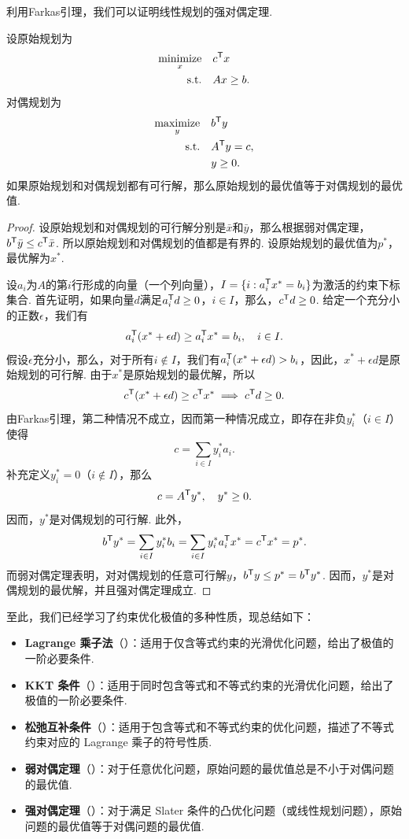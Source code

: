 利用Farkas引理，我们可以证明线性规划的强对偶定理. 
\begin{theorem}[线性规划的强对偶定理]\label{theorem:strong-duality-linear}
    设原始规划为
    \begin{align*}
        \operatorname*{minimize}_{x}\quad&c^{\mathsf{T}} x\\
        \text{s.t.}\quad&A x\geq b.
    \end{align*}
    对偶规划为
    \begin{align*}
        \operatorname*{maximize}_{y}\quad&b^{\mathsf{T}} y\\
        \text{s.t.}\quad&A^{\mathsf{T}} y=c,\\
        &y\geq 0.
    \end{align*}
如果原始规划和对偶规划都有可行解，那么原始规划的最优值等于对偶规划的最优值.
\end{theorem}
\begin{proof}
    设原始规划和对偶规划的可行解分别是$\bar{x}$和$\bar{y}$，那么根据弱对偶定理，$b^{\mathsf{T}} \bar{y}\leq c^{\mathsf{T}} \bar{x}$. 所以原始规划和对偶规划的值都是有界的. 设原始规划的最优值为$p^*$，最优解为$x^*$. 

    设$a_i$为$A$的第$i$行形成的向量（一个列向量），$I=\{i: a_i^{\mathsf{T}} x^*=b_i\}$为激活的约束下标集合. 首先证明，如果向量$d$满足$a_i^{\mathsf{T}} d\geq 0$，$i\in I$，那么，$c^{\mathsf{T}} d\geq 0$. 给定一个充分小的正数$\epsilon$，我们有
    \[a_i^{\mathsf{T}} (x^*+\epsilon d)\geq a_i^{\mathsf{T}} x^*=b_i,\quad i\in I.\]
    假设$\epsilon$充分小，那么，对于所有$i\notin I$，我们有$a_i^{\mathsf{T}} (x^*+\epsilon d)>b_i$，因此，$x^*+\epsilon d$是原始规划的可行解. 由于$x^*$是原始规划的最优解，所以
    \[c^{\mathsf{T}} (x^*+\epsilon d)\geq c^{\mathsf{T}} x^*\implies c^{\mathsf{T}} d\geq 0.\]
    由Farkas引理，第二种情况不成立，因而第一种情况成立，即存在非负$y_i^*$（$i\in I$）使得
    \[c=\sum_{i\in I} y_i^* a_i.\]
    补充定义$y_i^*=0$（$i\notin I$），那么
    \[c=A^{\mathsf{T}} y^*,\quad y^*\geq 0.\]
    因而，$y^*$是对偶规划的可行解. 此外，
    \[b^{\mathsf{T}} y^*=\sum_{i\in I} y_i^* b_i=\sum_{i\in I} y_i^* a_i^{\mathsf{T}} x^*=c^{\mathsf{T}} x^*=p^*.\]
    而弱对偶定理表明，对对偶规划的任意可行解$y$，$b^{\mathsf{T}} y\leq p^*=b^{\mathsf{T}} y^*$. 因而，$y^*$是对偶规划的最优解，并且强对偶定理成立.
\end{proof}


至此，我们已经学习了约束优化极值的多种性质，现总结如下：
\begin{itemize}
    \item \textbf{Lagrange 乘子法}（）：适用于仅含等式约束的光滑优化问题，给出了极值的一阶必要条件. 
    \item \textbf{KKT 条件}（）：适用于同时包含等式和不等式约束的光滑优化问题，给出了极值的一阶必要条件. 
    \item \textbf{松弛互补条件}（）：适用于包含等式和不等式约束的优化问题，描述了不等式约束对应的 Lagrange 乘子的符号性质. 
    \item \textbf{弱对偶定理}（）：对于任意优化问题，原始问题的最优值总是不小于对偶问题的最优值. 
    \item \textbf{强对偶定理}（）：对于满足 Slater 条件的凸优化问题（或线性规划问题），原始问题的最优值等于对偶问题的最优值. 
\end{itemize}

